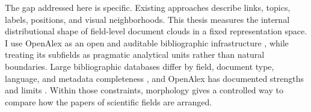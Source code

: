 The gap addressed here is specific. Existing approaches describe links, topics, labels, positions, and visual neighborhoods. This thesis measures the internal distributional shape of field-level document clouds in a fixed representation space. I use OpenAlex as an open and auditable bibliographic infrastructure \parencite{priem2022openalex}, while treating its subfields as pragmatic analytical units rather than natural boundaries. Large bibliographic databases differ by field, document type, language, and metadata completeness \parencite{martinmartin2021google}, and OpenAlex has documented strengths and limits \parencite{culbert2025reference}. Within those constraints, morphology gives a controlled way to compare how the papers of scientific fields are arranged.
